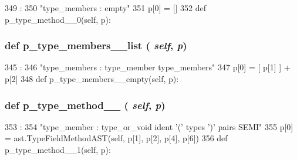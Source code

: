 \begin{DoxyVerb}
\begin{DoxyCode}
349                                       :
350         "type_members : empty"
351         p[0] = []
352 
    def p_type_method__0(self, p):
\end{DoxyCode}
\hypertarget{classslicc_1_1parser_1_1SLICC_a8c3e9ea7893a66490263b229b8f1292b}{
\subsubsection[{p\_\-type\_\-members\_\-\_\-list}]{\setlength{\rightskip}{0pt plus 5cm}def p\_\-type\_\-members\_\-\_\-list ( {\em self}, \/   {\em p})}}
\label{classslicc_1_1parser_1_1SLICC_a8c3e9ea7893a66490263b229b8f1292b}



\begin{DoxyCode}
345                                      :
346         "type_members : type_member type_members"
347         p[0] = [ p[1] ] + p[2]
348 
    def p_type_members__empty(self, p):
\end{DoxyCode}
\hypertarget{classslicc_1_1parser_1_1SLICC_ab2ba9bf97cd7869bee363f09c4e777b3}{
\subsubsection[{p\_\-type\_\-method\_\-\_\-0}]{\setlength{\rightskip}{0pt plus 5cm}def p\_\-type\_\-method\_\-\_ ( {\em self}, \/   {\em p})}}
\label{classslicc_1_1parser_1_1SLICC_ab2ba9bf97cd7869bee363f09c4e777b3}



\begin{DoxyCode}
353                                  :
354         "type_member : type_or_void ident '(' types ')' pairs SEMI"
355         p[0] = ast.TypeFieldMethodAST(self, p[1], p[2], p[4], p[6])
356 
    def p_type_method__1(self, p):
\end{DoxyCode}
\hypertarget{classslicc_1_1parser_1_1SLICC_ad508836482d67540f8b3b5bba6461560}{
}
\end{DoxyVerb}
